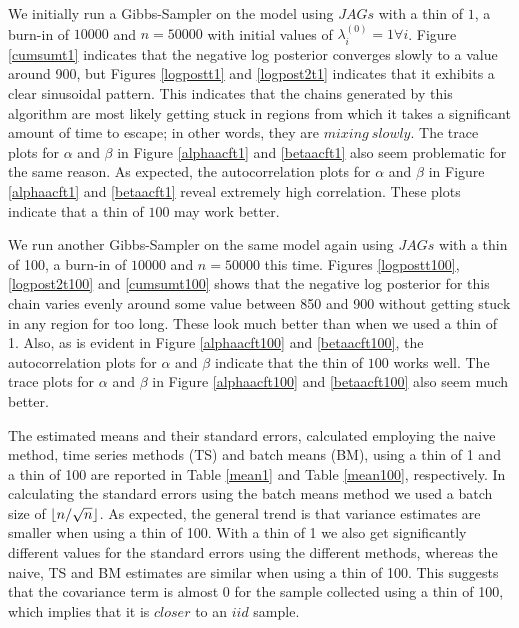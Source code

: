 \documentclass[12pt, leqno]{article}
\DeclarePairedDelimiter\floor{\lfloor}{\rfloor}
\begin{document}
We initially run a Gibbs-Sampler on the model using $JAGs$ with a thin of $1$, a burn-in of $10000$ and
$n=50000$ with initial values of $\lambda_i^{(0)} = 1 \forall i$. Figure \ref{cumsumt1}
indicates that the negative log posterior converges slowly
to a value around 900, but Figures \ref{logpostt1} and \ref{logpost2t1} indicates
that it exhibits a clear
sinusoidal pattern. This
indicates that the chains generated by this algorithm are most
likely getting stuck in regions from which it takes a significant
amount of time to escape; in other words, they are $mixing \: slowly$.  The trace plots for $\alpha$ and $\beta$ in Figure \ref{alphaacft1}
and \ref{betaacft1} also seem problematic for the same reason. As expected, the
autocorrelation plots for $\alpha$ and $\beta$ in
Figure \ref{alphaacft1} and \ref{betaacft1}
reveal extremely high
correlation. These plots indicate that a thin of $100$ may work better. 

We run another Gibbs-Sampler on the same model again using $JAGs$ with a thin of 100, a burn-in of $10000$ and
$n=50000$ this time. Figures \ref{logpostt100}, \ref{logpost2t100} and
\ref{cumsumt100} shows that the negative log posterior for this chain
varies evenly around some value between 850 and 900 without getting stuck in any region for too
long. These look much better than when we used a thin of 1. Also, as
is evident in
Figure \ref{alphaacft100} and \ref{betaacft100}, the
autocorrelation plots for $\alpha$ and $\beta$ indicate that the thin
of $100$ works well. The trace plots for $\alpha$ and $\beta$ in Figure \ref{alphaacft100}
and \ref{betaacft100} also seem much better. 

The estimated means and
their standard errors, calculated employing the naive method, time series methods (TS) and
batch means (BM), using a thin of 1 and a thin of 100 are
reported in Table \ref{mean1} and Table \ref{mean100}, respectively. In calculating the standard errors using
the batch means method we used a batch size of
$\floor{n/ \sqrt{n}}$. As expected, the general trend is that 
variance estimates are smaller when using a thin of 100. With a thin
of 1 we also get significantly
different values for the standard errors using the different methods,
whereas the naive, TS and BM estimates are similar when using a thin of 100. This suggests
that the covariance term is almost $0$ for the sample collected using a thin of 100, which implies that it is $closer$
to an $iid$ sample. 
\end{document}

